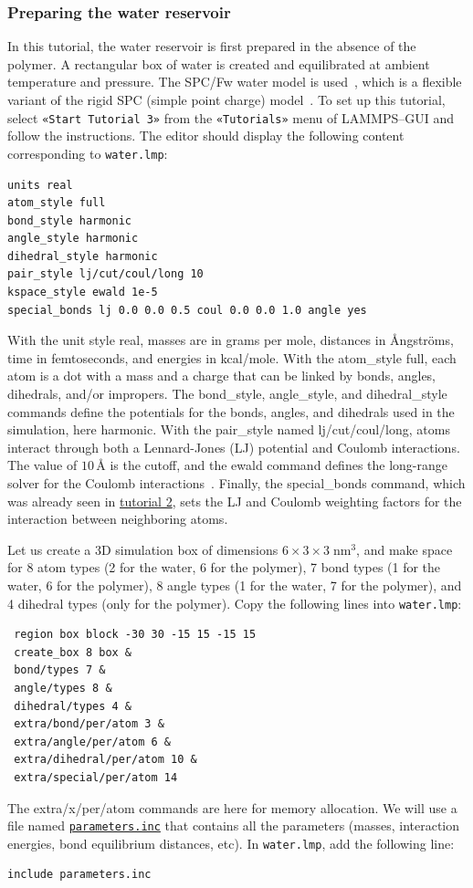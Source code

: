 \documentclass[9pt,tutorial]{livecoms}
\newcommand{\lmpcmd}[1]{\hspace{0pt}\colorbox{listing}{\textcolor{command}{\small{#1}}}\hspace{0pt}} %
\newcommand{\flecmd}[1]{\textcolor{command}{\texttt{#1}}} %
\newcommand{\guicmd}[1]{\textcolor{command}{\texttt{«#1»}}} %
\newcommand{\dwlcmd}[1]{\textcolor{download}{\texttt{#1}}} %
\newcommand{\filepath}{https://raw.githubusercontent.com/lammpstutorials/lammpstutorials-article/main/files/}
\begin{document}
\subsubsection{Preparing the water reservoir}

In this tutorial, the water reservoir is first prepared in the absence of the polymer.
A rectangular box of water is created and equilibrated at ambient temperature and
pressure.  The SPC/Fw water model is used~\cite{wu2006flexible}, which is
a flexible variant of the rigid SPC (simple point charge) model~\cite{berendsen1981interaction}.
To set up this tutorial, select \guicmd{Start Tutorial 3} from the
\guicmd{Tutorials} menu of LAMMPS--GUI and follow the instructions.
The editor should display the following content corresponding to \flecmd{water.lmp}:
\begin{lstlisting}
units real
atom_style full
bond_style harmonic
angle_style harmonic
dihedral_style harmonic
pair_style lj/cut/coul/long 10
kspace_style ewald 1e-5
special_bonds lj 0.0 0.0 0.5 coul 0.0 0.0 1.0 angle yes
\end{lstlisting}
With the unit style \lmpcmd{real}, masses are in grams per mole, distances in
Ångströms, time in femtoseconds, and energies in kcal/mole.  With the \lmpcmd{atom\_style full},
each atom is a dot with a mass and a charge that can be linked by bonds, angles,
dihedrals, and/or impropers.  The \lmpcmd{bond\_style},
\lmpcmd{angle\_style}, and \lmpcmd{dihedral\_style} commands define the potentials
for the bonds, angles, and dihedrals used in the simulation, here \lmpcmd{harmonic}.
With the \lmpcmd{pair\_style} named \lmpcmd{lj/cut/coul/long}, atoms interact through
both a Lennard-Jones (LJ) potential and Coulomb interactions.  The value of $10\,\text{\AA{}}$ is the cutoff,
and the \lmpcmd{ewald} command defines the long-range solver for the Coulomb
interactions~\cite{ewald1921berechnung}.  Finally, the \lmpcmd{special\_bonds} command, which was already seen in
\hyperref[carbon-nanotube-label]{tutorial 2}, sets the LJ and Coulomb weighting
factors for the interaction between neighboring atoms.

Let us create a 3D simulation box of dimensions $6 \times 3 \times 3 \; \text{nm}^3$,
and make space for 8 atom types (2 for the water, 6 for the polymer), 7 bond types
(1 for the water, 6 for the polymer), 8 angle types (1 for the water, 7 for the polymer),
and 4 dihedral types (only for the polymer).  Copy the following lines into \flecmd{water.lmp}:
\begin{lstlisting}
 region box block -30 30 -15 15 -15 15
 create_box 8 box &
 bond/types 7 &
 angle/types 8 &
 dihedral/types 4 &
 extra/bond/per/atom 3 &
 extra/angle/per/atom 6 &
 extra/dihedral/per/atom 10 &
 extra/special/per/atom 14
\end{lstlisting}
The \lmpcmd{extra/x/per/atom} commands are here for
memory allocation.  We will use a file named
\href{\filepath tutorial3/parameters.inc}{\dwlcmd{parameters.inc}} that contains
all the parameters (masses, interaction energies, bond equilibrium
distances, etc).  In \flecmd{water.lmp}, add the following line:
\begin{lstlisting}
include parameters.inc
\end{lstlisting}
\end{document}
